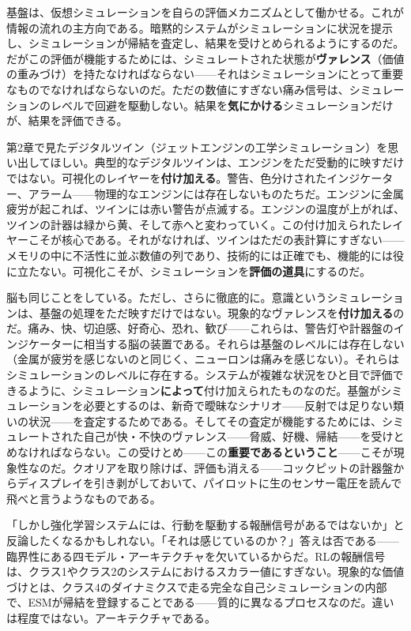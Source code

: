 \documentclass[11pt, twoside, openright]{book}
\begin{document}
基盤は、仮想シミュレーションを自らの評価メカニズムとして働かせる。これが情報の流れの主方向である。暗黙的システムがシミュレーションに状況を提示し、シミュレーションが帰結を査定し、結果を受けとめられるようにするのだ。だがこの評価が機能するためには、シミュレートされた状態が\textbf{ヴァレンス}（価値の重みづけ）を持たなければならない------それはシミュレーションにとって重要なものでなければならないのだ。ただの数値にすぎない痛み信号は、シミュレーションのレベルで回避を駆動しない。結果を\textbf{気にかける}シミュレーションだけが、結果を評価できる。

第2章で見たデジタルツイン（ジェットエンジンの工学シミュレーション）を思い出してほしい。典型的なデジタルツインは、エンジンをただ受動的に映すだけではない。可視化のレイヤーを\textbf{付け加える}。警告、色分けされたインジケーター、アラーム------物理的なエンジンには存在しないものたちだ。エンジンに金属疲労が起これば、ツインには赤い警告が点滅する。エンジンの温度が上がれば、ツインの計器は緑から黄、そして赤へと変わっていく。この付け加えられたレイヤーこそが核心である。それがなければ、ツインはただの表計算にすぎない------メモリの中に不活性に並ぶ数値の列であり、技術的には正確でも、機能的には役に立たない。可視化こそが、シミュレーションを\textbf{評価の道具}にするのだ。

脳も同じことをしている。ただし、さらに徹底的に。意識というシミュレーションは、基盤の処理をただ映すだけではない。現象的なヴァレンスを\textbf{付け加える}のだ。痛み、快、切迫感、好奇心、恐れ、歓び------これらは、警告灯や計器盤のインジケーターに相当する脳の装置である。それらは基盤のレベルには存在しない（金属が疲労を感じないのと同じく、ニューロンは痛みを感じない）。それらはシミュレーションのレベルに存在する。システムが複雑な状況をひと目で評価できるように、シミュレーション\textbf{によって}付け加えられたものなのだ。基盤がシミュレーションを必要とするのは、新奇で曖昧なシナリオ------反射では足りない類いの状況------を査定するためである。そしてその査定が機能するためには、シミュレートされた自己が快・不快のヴァレンス------脅威、好機、帰結------を受けとめなければならない。この受けとめ------この\textbf{重要であるということ}------こそが現象性なのだ。クオリアを取り除けば、評価も消える------コックピットの計器盤からディスプレイを引き剥がしておいて、パイロットに生のセンサー電圧を読んで飛べと言うようなものである。

「しかし強化学習システムには、行動を駆動する報酬信号があるではないか」と反論したくなるかもしれない。「それは感じているのか？」答えは否である------臨界性にある四モデル・アーキテクチャを欠いているからだ。RLの報酬信号は、クラス1やクラス2のシステムにおけるスカラー値にすぎない。現象的な価値づけとは、クラス4のダイナミクスで走る完全な自己シミュレーションの内部で、ESMが帰結を登録することである------質的に異なるプロセスなのだ。違いは程度ではない。アーキテクチャである。
\end{document}
